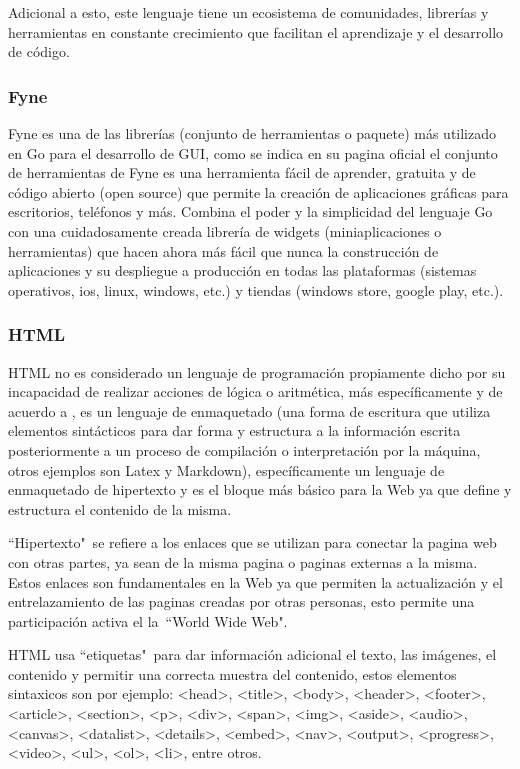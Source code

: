 Adicional a esto, este lenguaje tiene un ecosistema de comunidades, librerías y
herramientas en constante crecimiento que facilitan el aprendizaje y el desarrollo
de código.

\subsubsection{Fyne}

Fyne es una de las librerías (conjunto de herramientas o paquete) más utilizado
en Go para el desarrollo de GUI, como se indica en su pagina oficial \cite{fyne}
el conjunto de herramientas de Fyne es una herramienta fácil de aprender, gratuita
y de código abierto (open source) que permite la creación de aplicaciones gráficas
para escritorios, teléfonos y más. Combina el poder y la simplicidad del lenguaje
Go con una cuidadosamente creada librería de widgets (miniaplicaciones o herramientas)
que hacen ahora más fácil que nunca la construcción de aplicaciones y su despliegue
a producción en todas las plataformas (sistemas operativos, ios, linux, windows, etc.)
y tiendas (windows store, google play, etc.).

\subsubsection{HTML}

HTML no es considerado un lenguaje de programación propiamente dicho por su
incapacidad de realizar acciones de lógica o aritmética, más específicamente y
de acuerdo a \cite{HTML},
es un lenguaje de enmaquetado (una forma de escritura que utiliza elementos
sintácticos para dar forma y estructura a la información escrita posteriormente
a un proceso de  compilación o interpretación por la máquina, otros ejemplos son
Latex y Markdown), específicamente un lenguaje de enmaquetado de hipertexto y es
el bloque más básico para la Web ya que define y estructura el contenido de la
misma.

``Hipertexto"\  se refiere a los enlaces que se utilizan para conectar la pagina
web con otras partes, ya sean de la misma pagina o paginas externas a la misma.
Estos enlaces son fundamentales en la Web ya que permiten la actualización y el
entrelazamiento de las paginas creadas por otras personas, esto permite
una participación activa el la\  ``World Wide Web".

HTML usa ``etiquetas"\  para dar información adicional  el texto, las imágenes,
el contenido y permitir
una correcta muestra del contenido, estos elementos sintaxicos son por ejemplo:
 <head>, <title>, <body>, <header>, <footer>, <article>, <section>, <p>, <div>,
 <span>, <img>, <aside>, <audio>, <canvas>, <datalist>, <details>, <embed>,
 <nav>, <output>, <progress>, <video>, <ul>, <ol>, <li>, entre otros.

